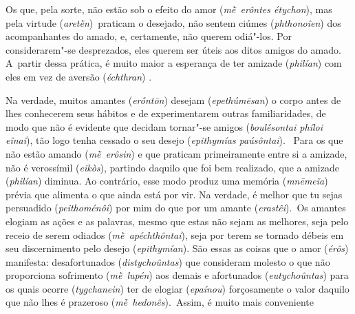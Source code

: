 Os que, pela sorte, não estão sob o efeito do amor (\emph{mḕ~erôntes
étychon}), mas pela virtude (\emph{aretḕn})~praticam o desejado, não
sentem ciúmes (\emph{phthonoîen}) dos acompanhantes do amado, e,
certamente, não querem odiá"-los. Por considerarem"-se desprezados, eles
querem ser úteis aos ditos amigos do amado. A~partir dessa prática, é
muito maior a esperança de ter amizade (\emph{philían}) com eles em vez
de aversão (\emph{échthran}) \bekker{[232e]}.

Na verdade, muitos amantes (\emph{erṓntōn}) desejam (\emph{epethúmēsan})
o corpo antes de lhes conhecerem seus hábitos e de experimentarem outras
familiaridades, de modo que não é evidente que decidam tornar"-se amigos
(\emph{boulḗsontai phíloi eînai}), tão logo tenha cessado o seu desejo
(\emph{epithymías paúsôntai}).~\bekker{[233a]} Para os que não estão amando
(\emph{mḕ~erôsin}) e que praticam primeiramente entre si a amizade, não
é verossímil (\emph{eikòs}), partindo daquilo que foi bem realizado, que
a amizade (\emph{philían}) diminua. Ao contrário, esse modo produz uma
memória (\emph{mnēmeĩa}) prévia que alimenta o que ainda está por vir.
Na verdade, é melhor que tu sejas persuadido (\emph{peithoménôi}) por
mim do que por um amante (\emph{erastêi}).~Os amantes elogiam as ações e
as palavras, mesmo que estas não sejam as melhores, seja pelo receio de
serem odiados (\emph{mḕ~apéchthôntai}), seja por terem se tornado débeis
em seu discernimento pelo desejo (\emph{epithymían}). \bekker{[233b]} São
essas as coisas que o amor (\emph{érôs}) manifesta: desafortunados
(\emph{distychoûntas}) que consideram molesto o que não proporciona
sofrimento (\emph{mḕ}~\emph{lupén}) aos demais e afortunados
(\emph{eutychoûntas}) para os quais ocorre (\emph{tygchanein}) ter de
elogiar (\emph{epaínou}) forçosamente o valor daquilo que não lhes é
prazeroso (\emph{mḕ~hedonês}).~Assim, é muito mais conveniente
